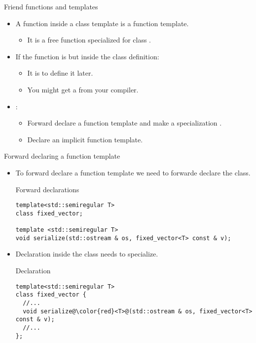 \begin{frame}[t,fragile]{Friend functions and templates}
\begin{itemize}
  \item A  function inside a class template is 
        a function template.
    \begin{itemize}
      \item It is a free function specialized for class .
    \end{itemize}

  \item If the function is  but 
        inside the class definition:
    \begin{itemize}
      \item It is  to define it later.
      \item You might get a  from your compiler.
    \end{itemize}

  \item {}:
    \begin{itemize}
      \item Forward declare a function template and make a specialization .
      \item Declare an implicit  function template.
    \end{itemize}
\end{itemize}
\end{frame}

\begin{frame}[t,fragile,shrink=15]{Forward declaring a function template}
\begin{itemize}
  \item To forward declare a function template we need to forwarde declare the class.

\begin{block}{Forward declarations}
\begin{lstlisting}
template<std::semiregular T>
class fixed_vector;

template <std::semiregular T>
void serialize(std::ostream & os, fixed_vector<T> const & v);
\end{lstlisting}
\end{block}

  \item Declaration inside the class needs to specialize.
\begin{block}{Declaration}
\begin{lstlisting}[escapechar=@]
template<std::semiregular T>
class fixed_vector {
  //...
  void serialize@\color{red}<T>@(std::ostream & os, fixed_vector<T> const & v);
  //...
};
\end{lstlisting}
\end{block}

\end{itemize}
\end{frame}


